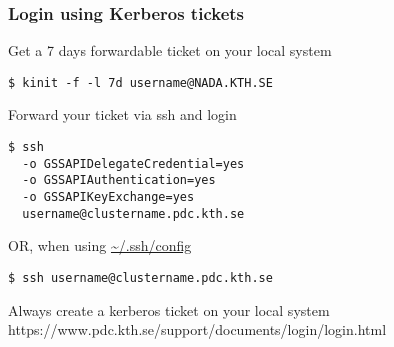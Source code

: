 \begin{frame}[fragile]
\frametitle{Login using Kerberos tickets}

\begin{block}{Get a 7 days forwardable ticket on your local system}
\begin{verbatim}
$ kinit -f -l 7d username@NADA.KTH.SE
\end{verbatim}
\end{block}

\begin{block}{Forward your ticket via ssh and login}
\begin{verbatim}
$ ssh
  -o GSSAPIDelegateCredential=yes
  -o GSSAPIAuthentication=yes
  -o GSSAPIKeyExchange=yes
  username@clustername.pdc.kth.se
\end{verbatim}
\end{block}

\begin{block}{OR, when using \url{~/.ssh/config}}
\begin{verbatim}
$ ssh username@clustername.pdc.kth.se
\end{verbatim}
\end{block}

\alert{Always create a kerberos ticket on your local system}
\alert{https://www.pdc.kth.se/support/documents/login/login.html}
\end{frame}
